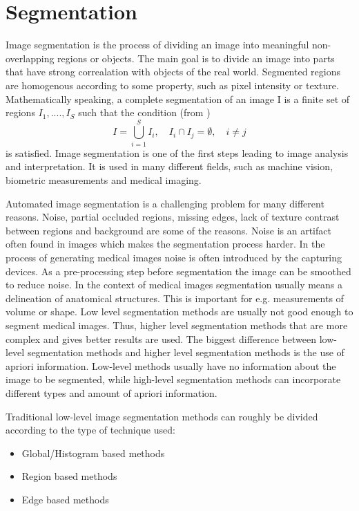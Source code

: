 \chapter{Segmentation}
Image segmentation is the process of dividing an image into meaningful non-overlapping regions or objects. The main goal is to divide an image into parts that have strong correalation with objects of the real world. Segmented regions are homogenous according to some property, such as pixel intensity or texture. Mathematically speaking, a complete segmentation of an image I is a finite set of regions \(I_1,...., I_S\) such that the condition (from \cite{drung00})
\begin{equation}
I = \bigcup_{i=1}^S I_{i} , \quad I_{i} \cap I_{j} = \emptyset , \quad i \neq j
\label{segCond}
\end{equation}
is satisfied. Image segmentation is one of the first steps leading to image analysis and interpretation. It is used in many different fields, such as machine vision, biometric measurements and medical imaging.

Automated image segmentation is a challenging problem for many different reasons. Noise, partial occluded regions, missing edges, lack of texture contrast between regions and background are some of the reasons. Noise is an artifact often found in images which makes the segmentation process harder. In the process of generating medical images noise is often introduced by the capturing devices. As a pre-processing step before segmentation the image can be smoothed to reduce noise. In the context of medical images segmentation usually means a delineation of anatomical structures. This is important for e.g. measurements of volume or shape. Low level segmentation methods are usually not good enough to segment medical images. Thus, higher level segmentation methods that are more complex and gives better results are used. The biggest difference between low-level segmentation methods and higher level segmentation methods is the use of apriori information. Low-level methods usually have no information about the image to be segmented, while high-level segmentation methods can incorporate different types and amount of apriori information.

Traditional low-level image segmentation methods can roughly be divided according to the type of technique used:
\begin{itemize}
  \item Global/Histogram based methods
  \item Region based methods
  \item Edge based methods
\end{itemize}

